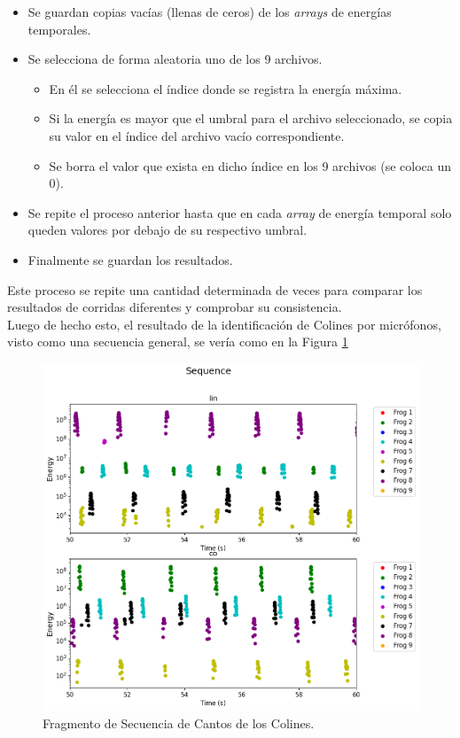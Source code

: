 \documentclass[a4paper,10pt,twocolumn]{article}
\begin{document}
\begin{itemize}
	\item Se guardan copias vacías (llenas de ceros) de los \textit{arrays} de energías temporales.
	\item Se selecciona de forma aleatoria uno de los 9 archivos. 
	\begin{itemize}
		\item En él se selecciona el índice donde se registra la energía máxima. 
		\item Si la energía es mayor que el umbral para el archivo seleccionado, se copia su valor en el índice del archivo vacío correspondiente.
		\item Se borra el valor que exista en dicho índice en los 9 archivos (se coloca un 0).
	\end{itemize}
	\item Se repite el proceso anterior hasta que en cada \textit{array} de energía temporal solo queden valores por debajo de su respectivo umbral.
	\item Finalmente se guardan los resultados.
\end{itemize}

Este proceso se repite una cantidad determinada de veces para comparar los resultados de corridas diferentes y comprobar su consistencia.\\


Luego de hecho esto, el resultado de la identificación de Colines por micrófonos, visto como una secuencia general, se vería como en la Figura \ref{fig:seq}

\begin{figure}[h!]
    \centering
    \includegraphics[width=\columnwidth]{assets/sequence.png}
    \caption{Fragmento de Secuencia de Cantos de los Colines.}
    \label{fig:seq}
\end{figure}
\end{document}
